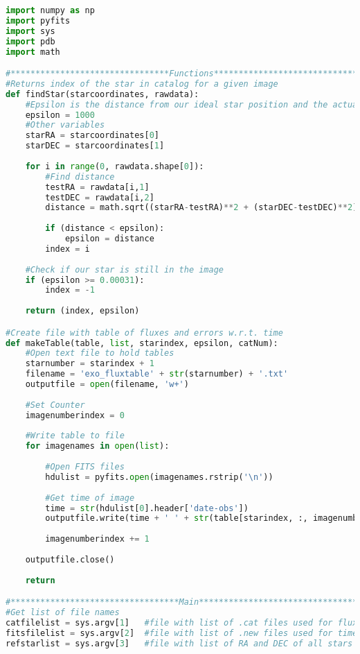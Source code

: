 \documentclass{aastex}
\begin{document}
\begin{lstlisting}[language = Python, caption = Outputs the flux and its error for each star in every exposure as well as the time for each image (YM)]
import numpy as np
import pyfits
import sys
import pdb
import math

#********************************Functions**************************************
#Returns index of the star in catalog for a given image
def findStar(starcoordinates, rawdata):
	#Epsilon is the distance from our ideal star position and the actual position
	epsilon = 1000
	#Other variables
	starRA = starcoordinates[0]
	starDEC = starcoordinates[1]
	
	for i in range(0, rawdata.shape[0]):
		#Find distance
		testRA = rawdata[i,1]
		testDEC = rawdata[i,2]
		distance = math.sqrt((starRA-testRA)**2 + (starDEC-testDEC)**2)
		
		if (distance < epsilon):
			epsilon = distance
		index = i
	
	#Check if our star is still in the image
	if (epsilon >= 0.00031):
		index = -1
	
	return (index, epsilon)

#Create file with table of fluxes and errors w.r.t. time
def makeTable(table, list, starindex, epsilon, catNum):
	#Open text file to hold tables
	starnumber = starindex + 1
	filename = 'exo_fluxtable' + str(starnumber) + '.txt'
	outputfile = open(filename, 'w+') 
	
	#Set Counter
	imagenumberindex = 0     
	
	#Write table to file
	for imagenames in open(list):
		
		#Open FITS files
		hdulist = pyfits.open(imagenames.rstrip('\n'))
		
		#Get time of image
		time = str(hdulist[0].header['date-obs'])
		outputfile.write(time + ' ' + str(table[starindex, :, imagenumberindex]) + ' ' + str(epsilon[starindex, imagenumberindex]) + ' ' + str(catNum[starindex, imagenumberindex]) + '\n')	
		
		imagenumberindex += 1
	
	outputfile.close()
	
	return

#**********************************Main*****************************************
#Get list of file names
catfilelist = sys.argv[1]   #file with list of .cat files used for fluxes
fitsfilelist = sys.argv[2]  #file with list of .new files used for times
refstarlist = sys.argv[3]   #file with list of RA and DEC of all stars


\end{lstlisting}
\end{document}
